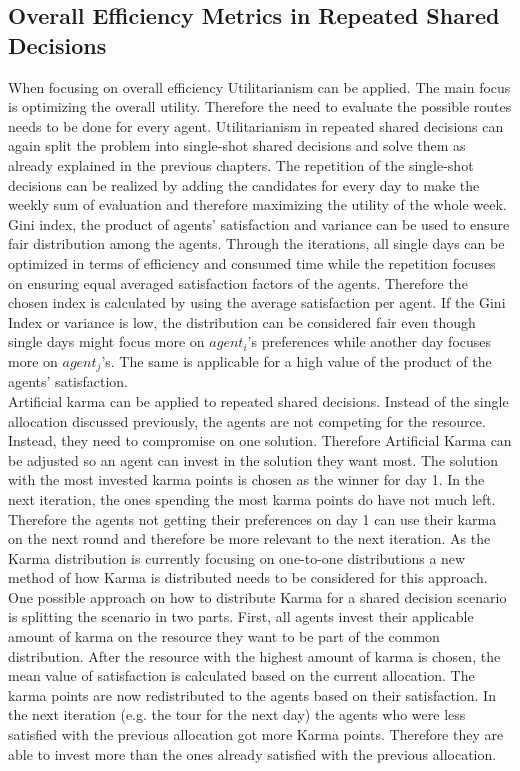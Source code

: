 \documentclass[german, a4paper, 11pt, oneside]{scrbook}
\begin{document}
\subsection{Overall Efficiency Metrics in Repeated Shared Decisions}
When focusing on overall efficiency Utilitarianism can be applied. The main focus is optimizing the overall utility. Therefore the need to evaluate the possible routes needs to be done for every agent. Utilitarianism in repeated shared decisions can again split the problem into single-shot shared decisions and solve them as already explained in the previous chapters. The repetition of the single-shot decisions can be realized by adding the candidates for every day to make the weekly sum of evaluation and therefore maximizing the utility of the whole week. \\Gini index, the product of agents' satisfaction and variance can be used to ensure fair distribution among the agents. Through the iterations, all single days can be optimized in terms of efficiency and consumed time while the repetition focuses on ensuring equal averaged satisfaction factors of the agents. Therefore the chosen index is calculated by using the average satisfaction per agent. If the Gini Index or variance is low, the distribution can be considered fair even though single days might focus more on $agent_i$'s preferences while another day focuses more on $agent_ j$'s. The same is applicable for a high value of the product of the agents' satisfaction.
\\Artificial karma can be applied to repeated shared decisions. Instead of the single allocation discussed previously, the agents are not competing for the resource. Instead, they need to compromise on one solution. Therefore Artificial Karma can be adjusted so an agent can invest in the solution they want most. The solution with the most invested karma points is chosen as the winner for day 1. In the next iteration, the ones spending the most karma points do have not much left. Therefore the agents not getting their preferences on day 1 can use their karma on the next round and therefore be more relevant to the next iteration. As the Karma distribution is currently focusing on one-to-one distributions a new method of how Karma is distributed needs to be considered for this approach. \\One possible approach on how to distribute Karma for a shared decision scenario is splitting the scenario in two parts. First, all agents invest their applicable amount of karma on the resource they want to be part of the common distribution. After the resource with the highest amount of karma is chosen, the mean value of satisfaction is calculated based on the current allocation. The karma points are now redistributed to the agents based on their satisfaction. In the next iteration (e.g. the tour for the next day) the agents who were less satisfied with the previous allocation got more Karma points. Therefore they are able to invest more than the ones already satisfied with the previous allocation.
\end{document}
